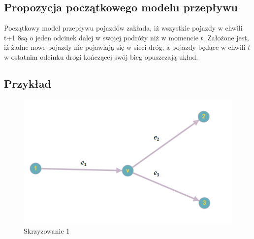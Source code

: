 \documentclass[12pt]{book}
\theoremstyle{plain}
\begin{document}
\subsection{Propozycja początkowego modelu przepływu}
Początkowy model przepływu pojazdów zakłada, iż wszystkie pojazdy w chwili t+1 8są o jeden odcinek dalej w swojej podróży niż w momencie $t$. Założone jest, iż żadne nowe pojazdy nie pojawiają się w sieci dróg, a pojazdy będące w chwili $t$ w ostatnim odcinku drogi kończącej swój bieg opuszczają układ.
\subsection{Przykład}
\begin{figure}[H]
	\centering
	\includegraphics[width=14cm]{skrz_1}
	\caption{Skrzyzowanie 1}
	\label{fig:skrz_1}
\end{figure}
\end{document}
